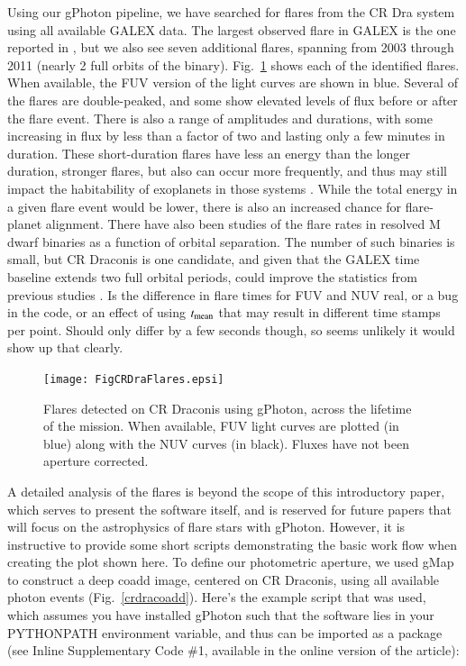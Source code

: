 \documentclass[5p]{elsarticle}
\begin{document}
Using our gPhoton pipeline, we have searched for flares from the CR Dra system using all available GALEX data.  The largest observed flare in GALEX is the one reported in \citet{wel2006}, but we also see seven additional flares, spanning from 2003 through 2011 (nearly 2 full orbits of the binary).  Fig.\ \ref{crdraflares} shows each of the identified flares.  When available, the FUV version of the light curves are shown in blue.  Several of the flares are double-peaked, and some show elevated levels of flux before or after the flare event.  There is also a range of amplitudes and durations, with some increasing in flux by less than a factor of two and lasting only a few minutes in duration.  These short-duration flares have less an energy than the longer duration, stronger flares, but also can occur more frequently, and thus may still impact the habitability of exoplanets in those systems \citep[e.g.,][]{ram2013}.  While the total energy in a given flare event would be lower, there is also an increased chance for flare-planet alignment.  There have also been studies of the flare rates in resolved M dwarf binaries as a function of orbital separation.  The number of such binaries is small, but CR Draconis is one candidate, and given that the GALEX time baseline extends two full orbital periods, could improve the statistics from previous studies \citep{tam2008}.  {\color{red}Is the difference in flare times for FUV and NUV real, or a bug in the code, or an effect of using $t_{\rm{mean}}$ that may result in different time stamps per point.  Should only differ by a few seconds though, so seems unlikely it would show up that clearly.}

\begin{figure}
\texttt{[image: FigCRDraFlares.epsi]}
\caption{Flares detected on CR Draconis using gPhoton, across the lifetime of the mission.  When available, FUV light curves are plotted (in blue) along with the NUV curves (in black).  Fluxes have not been aperture corrected. \label{crdraflares}}
\end{figure}

A detailed analysis of the flares is beyond the scope of this introductory paper, which serves to present the software itself, and is reserved for future papers that will focus on the astrophysics of flare stars with gPhoton.  However, it is instructive to provide some short scripts demonstrating the basic work flow when creating the plot shown here.  To define our photometric aperture, we used gMap to construct a deep coadd image, centered on CR Draconis, using all available photon events (Fig.\ \ref{crdracoadd}).  Here's the example script that was used, which assumes you have installed gPhoton such that the software lies in your PYTHONPATH environment variable, and thus can be imported as a package (see Inline Supplementary Code \#1, available in the online version of the article):
\end{document}
